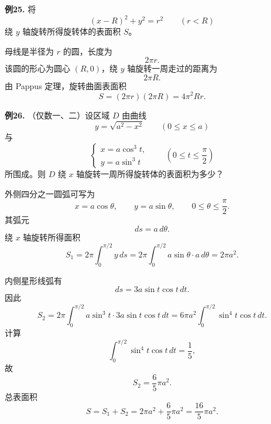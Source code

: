 \begin{problemblock}
\textbf{例25.} 将
\[
(x-R)^2+y^2=r^2\qquad (r<R)
\]
绕 \(y\) 轴旋转所得旋转体的表面积 \(S\)。
\end{problemblock}
\begin{solutionblock}
母线是半径为 \(r\) 的圆，长度为
\[
2\pi r.
\]
该圆的形心为圆心 \((R,0)\)，绕 \(y\) 轴旋转一周走过的距离为
\[
2\pi R.
\]
由 Pappus 定理，旋转曲面表面积
\[
S=(2\pi r)(2\pi R)=4\pi^2Rr.
\]
\end{solutionblock}

\begin{problemblock}
\textbf{例26.} （仅数一、二）设区域 \(D\) 由曲线
\[
y=\sqrt{a^2-x^2}\qquad (0\le x\le a)
\]
与
\[
\begin{cases}
x=a\cos^3t,\\
y=a\sin^3t
\end{cases}
\qquad \left(0\le t\le\frac{\pi}{2}\right)
\]
所围成。则 \(D\) 绕 \(x\) 轴旋转一周所得旋转体的表面积为多少？
\end{problemblock}
\begin{solutionblock}
外侧四分之一圆弧可写为
\[
x=a\cos\theta,\qquad y=a\sin\theta,\qquad 0\le\theta\le\frac{\pi}{2}.
\]
其弧元
\[
ds=a\,d\theta.
\]
绕 \(x\) 轴旋转所得面积
\[
S_1=2\pi\int_0^{\pi/2}y\,ds
=2\pi\int_0^{\pi/2}a\sin\theta\cdot a\,d\theta
=2\pi a^2.
\]

内侧星形线弧有
\[
ds=3a\sin t\cos t\,dt.
\]
因此
\[
S_2=2\pi\int_0^{\pi/2}a\sin^3t\cdot3a\sin t\cos t\,dt
=6\pi a^2\int_0^{\pi/2}\sin^4t\cos t\,dt.
\]
计算
\[
\int_0^{\pi/2}\sin^4t\cos t\,dt=\frac15,
\]
故
\[
S_2=\frac65\pi a^2.
\]
总表面积
\[
S=S_1+S_2
=2\pi a^2+\frac65\pi a^2
=\frac{16}{5}\pi a^2.
\]
\end{solutionblock}

